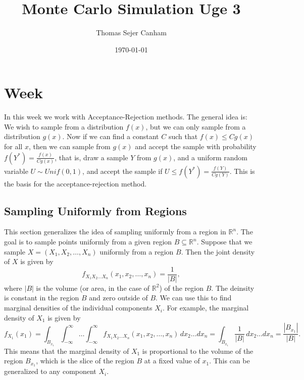 \documentclass{article}
\title{Monte Carlo Simulation Uge 3}
\author{Thomas Sejer Canham}
\date{\today}
\theoremstyle{definition}
\theoremstyle{remark}
\begin{document}

\begin{titlepage}

    \maketitle
    \thispagestyle{empty}

\end{titlepage}
\section{Week}

In this week we work with Acceptance-Rejection methods. The general idea is: We wish to sample from a distribution $f(x)$, but we can only sample from a distribution $g(x)$. Now if we can find a constant $C$ such that $f(x) \leq C g(x)$ for all $x$, then we can sample from $g(x)$ and accept the sample with probability $f(Y^*) = \frac{f(x)}{C g(x)}$, that is, draw a sample $Y$ from $g(x)$, and a uniform random variable $U \sim Unif(0,1)$, and accept the sample if $U \leq f(Y^*) = \frac{f(Y)}{C g(Y)}$. This is the basis for the acceptance-rejection method.

\subsection{Sampling Uniformly from Regions}
This section generalizes the idea of sampling uniformly from a region in $\mathbb{R}^n$. The goal is to sample points uniformly from a given region $B \subseteq \mathbb{R}^n$. Suppose that we sample $X = (X_1, X_2, \ldots, X_n)$ uniformly from a region $B$. Then the joint density of $X$ is given by
\begin{equation}
    f_{X_1X_2\ldots X_n}(x_1, x_2, \ldots, x_n) = \dfrac{1}{|B|},
\end{equation}
where $|B|$ is the volume (or area, in the case of $\mathbb{R}^2$) of the region $B$. The deinsity is constant in the region $B$ and zero outside of $B$. We can use this to find marginal densities of the individual components $X_i$. For example, the marginal density of $X_1$ is given by
\begin{equation}
    f_{X_1}(x_1) = \int_{B_{x_1}} \int_{-\infty}^{\infty} \ldots \int_{-\infty}^{\infty} f_{X_1X_2\ldots X_n}(x_1, x_2, \ldots, x_n) \, dx_2 \ldots dx_n = \int_{B_{x_1}} \dfrac{1}{|B|} \, dx_2 \ldots dx_n = \dfrac{|B_{x_1}|}{|B|}.
\end{equation}
This means that the marginal density of $X_1$ is proportional to the volume of the region $B_{x_1}$, which is the slice of the region $B$ at a fixed value of $x_1$. This can be generalized to any component $X_i$.
\end{document}
